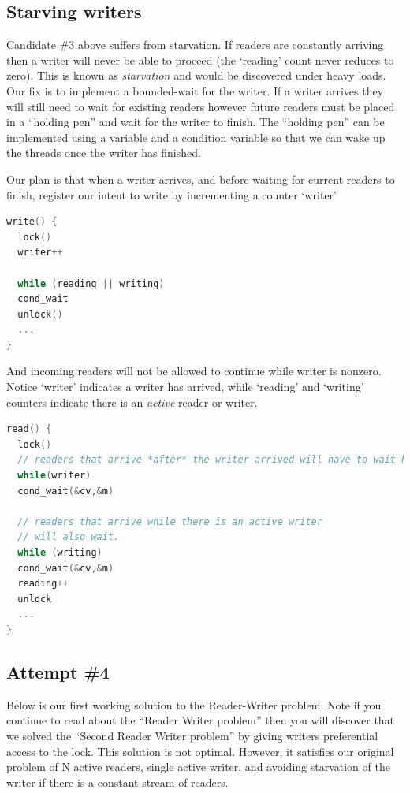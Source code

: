 \subsection{Starving writers}

Candidate \#3 above suffers from starvation.
If readers are constantly arriving then a writer will never be able to proceed (the `reading' count never reduces to zero).
This is known as \emph{starvation} and would be discovered under heavy loads.
Our fix is to implement a bounded-wait for the writer.
If a writer arrives they will still need to wait for existing readers however future readers must be placed in a ``holding pen'' and wait for the writer to finish.
The ``holding pen'' can be implemented using a variable and a condition variable so that we can wake up the threads once the writer has finished.

Our plan is that when a writer arrives, and before waiting for current readers to finish, register our intent to write by incrementing a counter `writer'

\begin{lstlisting}[language=C]
write() {
  lock()
  writer++

  while (reading || writing)
  cond_wait
  unlock()
  ...
}
\end{lstlisting}

And incoming readers will not be allowed to continue while writer is nonzero.
Notice `writer' indicates a writer has arrived, while `reading' and `writing' counters indicate there is an \emph{active} reader or writer.

\begin{lstlisting}[language=C]
read() {
  lock()
  // readers that arrive *after* the writer arrived will have to wait here!
  while(writer)
  cond_wait(&cv,&m)

  // readers that arrive while there is an active writer
  // will also wait.
  while (writing)
  cond_wait(&cv,&m)
  reading++
  unlock
  ...
}
\end{lstlisting}

\subsection{Attempt \#4}

Below is our first working solution to the Reader-Writer problem.
Note if you continue to read about the ``Reader Writer problem'' then you will discover that we solved the ``Second Reader Writer problem'' by giving writers preferential access to the lock.
This solution is not optimal.
However, it satisfies our original problem of N active readers, single active writer, and avoiding starvation of the writer if there is a constant stream of readers.

